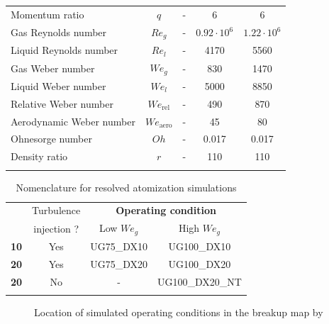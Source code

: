 \begin{table}[!h]
\begin{tabular}{lcccc}
Momentum ratio & $q$ & - & 6 & 6 \\
Gas Reynolds number & $Re_g$ & - & $0.92 \cdot 10^6$ & $1.22 \cdot 10^6$ \\
Liquid Reynolds number & $Re_l$ & - & 4170 & 5560 \\
Gas Weber number & $We_g$ & - & 830 & 1470 \\
Liquid Weber number & $We_l$ & - & 5000 & 8850 \\
Relative Weber number & $We_\mathrm{rel}$ & - & 490 & 870 \\
Aerodynamic Weber number & $We_\mathrm{aero}$ & - & 45 & 80 \\
Ohnesorge number & $Oh $ & - & 0.017 & 0.017 \\
Density ratio & $r$ & - & 110 & 110 \\
\thickhline
\end{tabular}
\label{tab:jicf_operating_conditions}
\end{table}



\clearpage

\begin{table}[!h]
\centering
\caption{Nomenclature for resolved atomization simulations}
\begin{tabular}{cccc}
\thickhline
\multirow{2}{*}{ $\Delta x_\mathrm{min}$ [$\mu$m] } & Turbulence & \multicolumn{2}{c}{\textbf{Operating condition}} \\ 
\cline{3-4}
 & injection ? & Low $We_g$ &  High $We_g$ \\ 
\thickhline
\textbf{10} & Yes & UG75\_DX10 & UG100\_DX10 \\
\textbf{20} & Yes & UG75\_DX20 & UG100\_DX20 \\
\textbf{20} & No & - & UG100\_DX20\_NT \\
\thickhline
\end{tabular}
\label{tab:jicf_resolved_simulations_performed}
\end{table}


\begin{figure}[ht]
     \centering
     \caption{Location of simulated operating conditions in the breakup map by \citeColor[wu_breakup_1997]}
      \label{fig:location_JICF_ops_in_breakup_map}
\end{figure}




